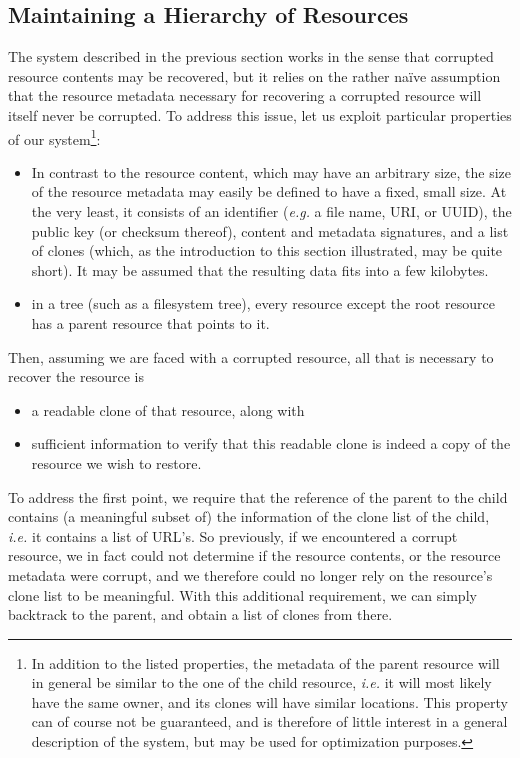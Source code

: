 \documentclass[11pt]{article}
\begin{document}
\begin{mainmatter}
\subsection{Maintaining a Hierarchy of Resources}
\label{hierarchy}
The system described in the previous section works in the sense that corrupted resource contents may be recovered, but it relies on the rather na\"ive assumption that the resource metadata necessary for recovering a corrupted resource will itself never be corrupted. To address this issue, let us exploit particular properties of our system\footnote{
In addition to the listed properties, the metadata of the parent resource will in general be similar to the one of the child resource, \emph{i.e.} it will most likely have the same owner, and its clones will have similar locations. This property can of course not be guaranteed, and is therefore of little interest in a general description of the system, but may be used for optimization purposes.
}:
\begin{itemize} 
\item In contrast to the resource content, which may have an arbitrary size, the size of the resource metadata may easily be defined to have a fixed, small size. At the very least, it consists of an identifier (\emph{e.g.} a file name, URI, or UUID), the public key (or checksum thereof), content and metadata signatures, and a list of clones (which, as the introduction to this section illustrated, may be quite short). It may be assumed that the resulting data fits into a few kilobytes.
\item in a tree (such as a filesystem tree), every resource except the root resource has a parent resource that points to it. 
\end{itemize}

Then, assuming we are faced with a corrupted resource, all that is necessary to recover the resource is 
\begin{itemize}
\item a readable clone of that resource, along with 
\item sufficient information to verify that this readable clone is indeed a copy of the resource we wish to restore.
\end{itemize}

To address the first point, we require that the reference of the parent to the child contains (a meaningful subset of) the information of the clone list of the child, \emph{i.e.} it contains a list of URL's. So previously, if we encountered a corrupt resource, we in fact could not determine if the resource contents, or the resource metadata were corrupt, and we therefore could no longer rely on the resource's clone list to be meaningful. With this additional requirement, we can simply backtrack to the parent, and obtain a list of clones from there. 


\end{mainmatter}
\end{document}
